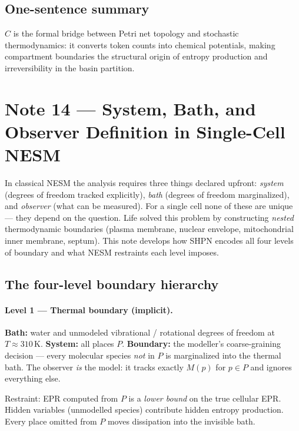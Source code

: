 \documentclass[11pt,a4paper]{article}
\begin{document}
\subsection*{One-sentence summary}

$C$ is the formal bridge between Petri net topology and stochastic
thermodynamics: it converts token counts into chemical potentials, making
compartment boundaries the structural origin of entropy production and
irreversibility in the basin partition.

\section*{Note 14 — System, Bath, and Observer Definition in Single-Cell NESM}
\label{note:system_boundary}

In classical NESM the analysis requires three things declared upfront:
\emph{system} (degrees of freedom tracked explicitly), \emph{bath}
(degrees of freedom marginalized), and \emph{observer} (what can be
measured).  For a single cell none of these are unique --- they depend on the
question.  Life solved this problem by constructing \emph{nested}
thermodynamic boundaries (plasma membrane, nuclear envelope, mitochondrial
inner membrane, septum).  This note develops how SHPN encodes all four levels
of boundary and what NESM restraints each level imposes.

\subsection*{The four-level boundary hierarchy}

\paragraph{Level 1 --- Thermal boundary (implicit).}
\textbf{Bath:} water and unmodeled vibrational / rotational degrees of freedom
at $T \approx 310\,\mathrm{K}$.
\textbf{System:} all places $P$.
\textbf{Boundary:} the modeller's coarse-graining decision --- every molecular
species \emph{not} in $P$ is marginalized into the thermal bath.
The observer \emph{is} the model: it tracks exactly $M(p)$ for $p \in P$
and ignores everything else.

\noindent Restraint: EPR computed from $P$ is a \emph{lower bound} on the
true cellular EPR.  Hidden variables (unmodelled species) contribute hidden
entropy production.  Every place omitted from $P$ moves dissipation into the
invisible bath.
\end{document}
